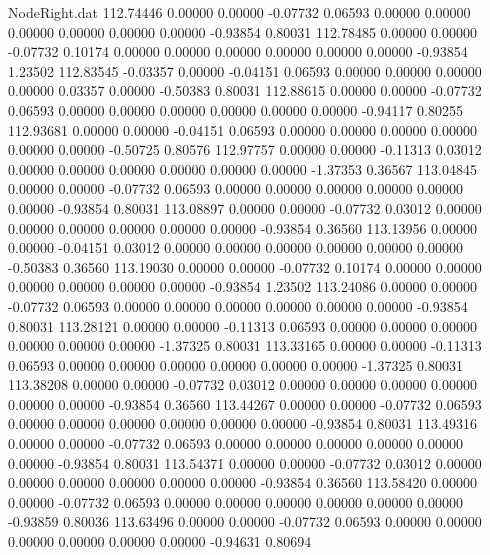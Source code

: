 \begin{filecontents}{NodeRight.dat}
 112.74446    0.00000    0.00000    -0.07732    0.06593    0.00000    0.00000    0.00000    0.00000    0.00000    0.00000   -0.93854    0.80031
 112.78485    0.00000    0.00000    -0.07732    0.10174    0.00000    0.00000    0.00000    0.00000    0.00000    0.00000   -0.93854    1.23502
 112.83545   -0.03357    0.00000    -0.04151    0.06593    0.00000    0.00000    0.00000    0.00000    0.03357    0.00000   -0.50383    0.80031
 112.88615    0.00000    0.00000    -0.07732    0.06593    0.00000    0.00000    0.00000    0.00000    0.00000    0.00000   -0.94117    0.80255
 112.93681    0.00000    0.00000    -0.04151    0.06593    0.00000    0.00000    0.00000    0.00000    0.00000    0.00000   -0.50725    0.80576
 112.97757    0.00000    0.00000    -0.11313    0.03012    0.00000    0.00000    0.00000    0.00000    0.00000    0.00000   -1.37353    0.36567
 113.04845    0.00000    0.00000    -0.07732    0.06593    0.00000    0.00000    0.00000    0.00000    0.00000    0.00000   -0.93854    0.80031
 113.08897    0.00000    0.00000    -0.07732    0.03012    0.00000    0.00000    0.00000    0.00000    0.00000    0.00000   -0.93854    0.36560
 113.13956    0.00000    0.00000    -0.04151    0.03012    0.00000    0.00000    0.00000    0.00000    0.00000    0.00000   -0.50383    0.36560
 113.19030    0.00000    0.00000    -0.07732    0.10174    0.00000    0.00000    0.00000    0.00000    0.00000    0.00000   -0.93854    1.23502
 113.24086    0.00000    0.00000    -0.07732    0.06593    0.00000    0.00000    0.00000    0.00000    0.00000    0.00000   -0.93854    0.80031
 113.28121    0.00000    0.00000    -0.11313    0.06593    0.00000    0.00000    0.00000    0.00000    0.00000    0.00000   -1.37325    0.80031
 113.33165    0.00000    0.00000    -0.11313    0.06593    0.00000    0.00000    0.00000    0.00000    0.00000    0.00000   -1.37325    0.80031
 113.38208    0.00000    0.00000    -0.07732    0.03012    0.00000    0.00000    0.00000    0.00000    0.00000    0.00000   -0.93854    0.36560
 113.44267    0.00000    0.00000    -0.07732    0.06593    0.00000    0.00000    0.00000    0.00000    0.00000    0.00000   -0.93854    0.80031
 113.49316    0.00000    0.00000    -0.07732    0.06593    0.00000    0.00000    0.00000    0.00000    0.00000    0.00000   -0.93854    0.80031
 113.54371    0.00000    0.00000    -0.07732    0.03012    0.00000    0.00000    0.00000    0.00000    0.00000    0.00000   -0.93854    0.36560
 113.58420    0.00000    0.00000    -0.07732    0.06593    0.00000    0.00000    0.00000    0.00000    0.00000    0.00000   -0.93859    0.80036
 113.63496    0.00000    0.00000    -0.07732    0.06593    0.00000    0.00000    0.00000    0.00000    0.00000    0.00000   -0.94631    0.80694

\end{filecontents}
